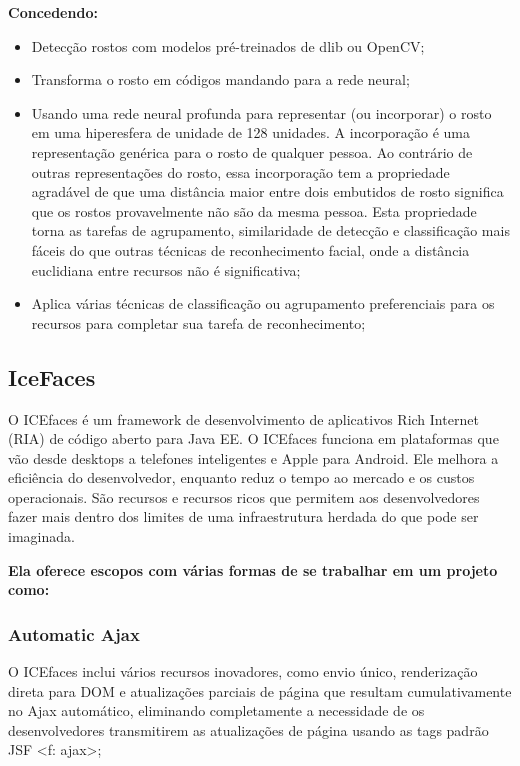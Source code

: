\documentclass[12pt,a4paper]{article}
\begin{document}
\textbf{Concedendo:}
\begin{itemize}
\item Detecção rostos com modelos pré-treinados de dlib ou OpenCV;

\item Transforma o rosto em códigos mandando para a rede neural;

\item Usando uma rede neural profunda para representar (ou incorporar) o rosto em uma hiperesfera de unidade de 128 unidades. A incorporação é uma representação genérica para o rosto de qualquer pessoa. Ao contrário de outras representações do rosto, essa incorporação tem a propriedade agradável de que uma distância maior entre dois embutidos de rosto significa que os rostos provavelmente não são da mesma pessoa. Esta propriedade torna as tarefas de agrupamento, similaridade de detecção e classificação mais fáceis do que outras técnicas de reconhecimento facial, onde a distância euclidiana entre recursos não é significativa;

\item Aplica várias técnicas de classificação ou agrupamento preferenciais para os recursos para completar sua tarefa de reconhecimento;
\end{itemize}

\subsection{IceFaces}
O ICEfaces é um framework de desenvolvimento de aplicativos Rich Internet (RIA) de código aberto para Java EE. O ICEfaces funciona em plataformas que vão desde desktops a telefones inteligentes e Apple para Android. Ele melhora a eficiência do desenvolvedor, enquanto reduz o tempo ao mercado e os custos operacionais. São recursos e recursos ricos que permitem aos desenvolvedores fazer mais dentro dos limites de uma infraestrutura herdada do que pode ser imaginada.
 
\vspace{0.5cm}
\textbf{Ela oferece escopos com várias formas de se trabalhar em um projeto como:}

\subsubsection{Automatic Ajax}
O ICEfaces inclui vários recursos inovadores, como envio único, renderização direta para DOM e atualizações parciais de página que resultam cumulativamente no Ajax automático, eliminando completamente a necessidade de os desenvolvedores transmitirem as atualizações de página usando as tags padrão JSF <f: ajax>;
\end{document}
